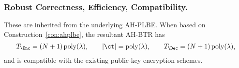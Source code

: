 \subsubsection{Robust Correctness, Efficiency, Compatibility.}
These are inherited from the underlying AH-PLBE\@.
When based on Construction~\ref{con:ahplbe},
the resultant AH-BTR has
\begin{align*}
T_\Enc=(N+1)\poly(\lambda),\qquad
|\ct|=\poly(\lambda),\qquad
T_\Dec=(N+1)\poly(\lambda),
\end{align*}
and is compatible with the existing public-key encryption schemes.
